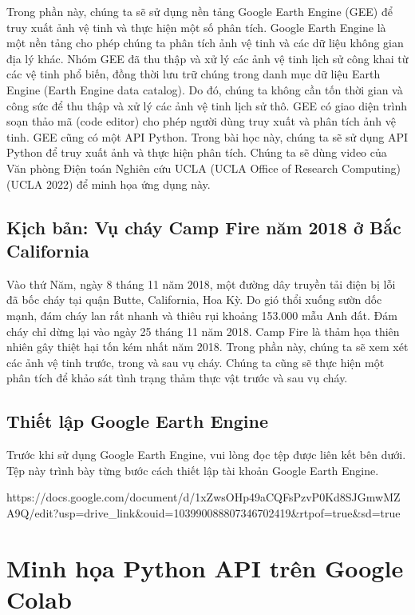 Trong phần này, chúng ta sẽ sử dụng nền tảng Google Earth Engine (GEE) để truy xuất ảnh vệ tinh và thực hiện một số phân tích. Google Earth Engine là một nền tảng cho phép chúng ta phân tích ảnh vệ tinh và các dữ liệu không gian địa lý khác. Nhóm GEE đã thu thập và xử lý các ảnh vệ tinh lịch sử công khai từ các vệ tinh phổ biến, đồng thời lưu trữ chúng trong danh mục dữ liệu Earth Engine (Earth Engine data catalog). Do đó, chúng ta không cần tốn thời gian và công sức để thu thập và xử lý các ảnh vệ tinh lịch sử thô. GEE có giao diện trình soạn thảo mã (code editor) cho phép người dùng truy xuất và phân tích ảnh vệ tinh. GEE cũng có một API Python. Trong bài học này, chúng ta sẽ sử dụng API Python để truy xuất ảnh và thực hiện phân tích. Chúng ta sẽ dùng video của Văn phòng Điện toán Nghiên cứu UCLA (UCLA Office of Research Computing) (UCLA 2022) để minh họa ứng dụng này.

\subsection{Kịch bản: Vụ cháy Camp Fire năm 2018 ở Bắc California}

Vào thứ Năm, ngày 8 tháng 11 năm 2018, một đường dây truyền tải điện bị lỗi đã bốc cháy tại quận Butte, California, Hoa Kỳ. Do gió thổi xuống sườn dốc mạnh, đám cháy lan rất nhanh và thiêu rụi khoảng 153.000 mẫu Anh đất. Đám cháy chỉ dừng lại vào ngày 25 tháng 11 năm 2018. Camp Fire là thảm họa thiên nhiên gây thiệt hại tốn kém nhất năm 2018. Trong phần này, chúng ta sẽ xem xét các ảnh vệ tinh trước, trong và sau vụ cháy. Chúng ta cũng sẽ thực hiện một phân tích để khảo sát tình trạng thảm thực vật trước và sau vụ cháy.

\subsection{Thiết lập Google Earth Engine}

Trước khi sử dụng Google Earth Engine, vui lòng đọc tệp được liên kết bên dưới. Tệp này trình bày từng bước cách thiết lập tài khoản Google Earth Engine.

https://docs.google.com/document/d/1xZwsOHp49aCQFsPzvP0Kd8SJGmwMZA9Q/edit?usp=drive\_link\&ouid=103990088807346702419\&rtpof=true\&sd=true

\section{Minh họa Python API trên Google Colab}

